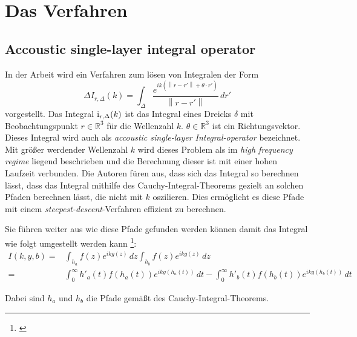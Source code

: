 \chapter{Das Verfahren}\label{algo}

\section{Accoustic single-layer integral operator}

In der Arbeit  wird ein Verfahren zum lösen von Integralen der Form
\begin{equation}
    \Delta
    I_{r,\Delta}(k) = \int_{\Delta}^{}  \frac{e^{ik(\left\lVert r-r'\right\rVert + \theta \cdot r')}}{\left\lVert r-r'\right\rVert} \,dr'
\end{equation}
vorgestellt. Das Integral ${\rm i}_{r,\Delta}(k)$ ist das Integral eines Dreicks $\delta$ mit Beobachtungspunkt $r \in \mathbb{R}^3$ für die Wellenzahl $k$. $\theta \in \mathbb{R}^3$ ist ein Richtungsvektor.
Dieses Integral wird auch als \textit{accoustic single-layer Integral-operator} bezeichnet.
Mit größer werdender Wellenzahl $k$ wird dieses Problem als im \textit{high frequency regime} liegend beschrieben und die Berechnung dieser ist mit einer hohen Laufzeit verbunden.
Die Autoren füren aus, dass sich das Integral so berechnen lässt, dass das Integral mithilfe des Cauchy-Integral-Theorems gezielt an solchen Pfaden berechnen lässt, die nicht mit $k$ oszilieren.
Dies ermöglicht es diese Pfade mit einem \textit{steepest-descent}-Verfahren effizient zu berechnen.

Sie führen weiter aus wie diese Pfade gefunden werden können damit das Integral wie folgt umgestellt werden kann \footnote{\cite[Kaptiel 1, Gleichung 4]{gasperini:hal-03209144}}:
\begin{equation}
    \begin{aligned}
        I(k,y,b) = & \int_{h_a}^{} f(z) e^{ikg(z)} \,dz  \int_{h_b}^{} f(z) e^{ikg(z)} \,dz \\
         = & \int_{0}^{\infty} h'_a(t)f(h_a(t))e^{ikg(h_a(t))} \,dt -\int_{0}^{\infty} h'_b(t)f(h_b(t))e^{ikg(h_b(t))} \,dt 
    \end{aligned}
\end{equation}

Dabei sind $h_a$ und $h_b$ die Pfade gemäßt des Cauchy-Integral-Theorems. %

